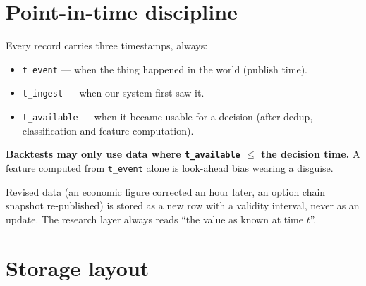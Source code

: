 \section{Point-in-time discipline}

\begin{keybox}[title={The three timestamps}]
Every record carries three timestamps, always:
\begin{itemize}
\item \texttt{t\_event} --- when the thing happened in the world (publish time).
\item \texttt{t\_ingest} --- when our system first saw it.
\item \texttt{t\_available} --- when it became usable for a decision (after
dedup, classification and feature computation).
\end{itemize}
\textbf{Backtests may only use data where \texttt{t\_available} $\le$ the
decision time.} A feature computed from \texttt{t\_event} alone is look-ahead
bias wearing a disguise.
\end{keybox}

Revised data (an economic figure corrected an hour later, an option chain
snapshot re-published) is stored as a new row with a validity interval, never as
an update. The research layer always reads ``the value as known at time $t$''.

\section{Storage layout}


